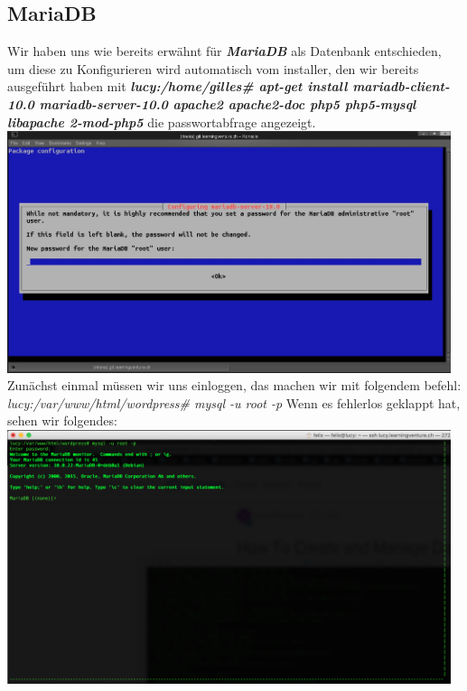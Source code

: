 \documentclass{article}
\begin{document}
	\subsection{MariaDB}
	Wir haben uns wie bereits erwähnt für \textit{\textbf{MariaDB}}  als Datenbank entschieden, um diese zu Konfigurieren wird automatisch vom installer, den wir bereits ausgeführt haben mit \textit{\textbf{lucy:/home/gilles\# apt-get install mariadb-client-10.0 mariadb-server-10.0 apache2 apache2-doc php5 php5-mysql libapache 2-mod-php5}} die passwortabfrage angezeigt.
	\newline
	\newline
	\includegraphics[width=13cm]{../Pics/3-lamp-stack-mariadb}
	\newline
	\newline
	Zunächst einmal müssen wir uns einloggen, das machen wir mit folgendem befehl:
	\newline
	\newline
	\textit{lucy:/var/www/html/wordpress\# mysql -u root -p}
	\newline
	\newline
	Wenn es fehlerlos geklappt hat, sehen wir folgendes:
	\newline
	\includegraphics[width=13cm]{../Pics/21-maria-db-login-success}
\end{document}
